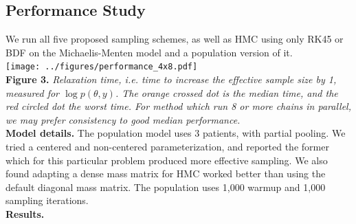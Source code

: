 \documentclass[21pt, custom, portrait, plainboxedsections]{sciposter}
\begin{document}
\begin{multicols}{3}
\columnbreak

\section*{Performance Study}

We run all five proposed sampling schemes, as well as HMC using only RK45 or BDF on the Michaelis-Menten model and a population version of it. \\

\texttt{[image: ../figures/performance\_4x8.pdf]} \\
\textbf{Figure 3.} \textit{Relaxation time, i.e. time to increase the effective sample size by 1, measured for $\log p(\theta, y)$. The orange crossed dot is the median time, and the red circled dot the worst time.
For method which run 8 or more chains in parallel,  we may prefer consistency to good median performance.} \\

\textbf{Model details.} The population model uses 3 patients, with partial pooling. 
We tried a centered and non-centered parameterization, and reported the former which for this particular problem produced more effective sampling.
We also found adapting a dense mass matrix for HMC worked better than using the default diagonal mass matrix.
The population uses 1,000 warmup and 1,000 sampling iterations. \\

\textbf{Results.} 


{\footnotesize


}

\end{multicols}
\end{document}
